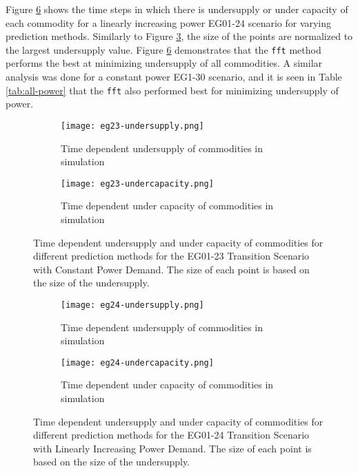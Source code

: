 Figure \ref{fig:eg24under} shows the time steps in which there is undersupply 
or under capacity of each commodity for a linearly increasing power EG01-24 
scenario for varying prediction methods.
Similarly to Figure \ref{fig:eg23under}, the size of the points are normalized 
to the largest undersupply value. 
Figure \ref{fig:eg24under} demonstrates that the \texttt{fft} method 
performs the best at minimizing undersupply of all commodities.
A similar analysis was done for a constant power EG1-30 scenario, and 
it is seen in Table \ref{tab:all-power} that the \texttt{fft} also performed 
best for minimizing undersupply of power. 

\begin{figure}[]
	\centering
	\begin{subfigure}[t]{1.2\textwidth}
		\centering
		\texttt{[image: eg23-undersupply.png]} 
		\caption{Time dependent undersupply of commodities in simulation }
		\label{fig:23undersupply}
	\end{subfigure}
	\vspace{1cm}
	\begin{subfigure}[t]{1.2\textwidth}
		\centering
		\texttt{[image: eg23-undercapacity.png]} 
		\caption{Time dependent under capacity of commodities in simulation }
		\label{fig:23undercapacity}
	\end{subfigure}
	\hfill
	\caption{Time dependent undersupply and under capacity of commodities 
	for different prediction methods for the 
	EG01-23 Transition Scenario with Constant Power Demand.
	The size of each point is based on the size of the undersupply.}
	\label{fig:eg23under}
\end{figure}

\begin{figure}[]
	\centering
	\begin{subfigure}[t]{1.2\textwidth}
		\centering
		\texttt{[image: eg24-undersupply.png]} 
		\caption{Time dependent undersupply of commodities in simulation }
		\label{fig:24undersupply}
	\end{subfigure}
	\vspace{1cm}
	\begin{subfigure}[t]{1.2\textwidth}
		\centering
		\texttt{[image: eg24-undercapacity.png]} 
		\caption{Time dependent under capacity of commodities in simulation }
		\label{fig:24undercapacity}
	\end{subfigure}
	\hfill
	\caption{Time dependent undersupply and under capacity of commodities 
	for different prediction methods for the 
	EG01-24 Transition Scenario with Linearly Increasing Power Demand.
	The size of each point is based on the size of the undersupply.}
	\label{fig:eg24under}
\end{figure}

